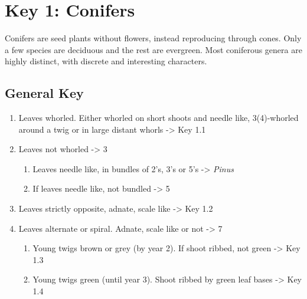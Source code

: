 \documentclass[openany]{book}
\providecommand{\tightlist}{%
  \setlength{\itemsep}{0pt}\setlength{\parskip}{0pt}}
\begin{document}
\hypertarget{key-1-conifers}{%
\chapter*{Key 1: Conifers}\label{key-1-conifers}}

Conifers are seed plants without flowers, instead reproducing through cones. Only a few species are deciduous and the rest are evergreen. Most coniferous genera are highly distinct, with discrete and interesting characters.

\hypertarget{general-key-1}{%
\section*{General Key}\label{general-key-1}}

\begin{enumerate}
\def\labelenumi{\arabic{enumi}.}
\item
  Leaves whorled. Either whorled on short shoots and needle like, 3(4)-whorled around a twig or in large distant whorls -\textgreater{} Key 1.1
\item
  Leaves not whorled -\textgreater{} 3

  \begin{enumerate}
  \def\labelenumii{\arabic{enumii}.}
  \setcounter{enumii}{2}
  \tightlist
  \item
    Leaves needle like, in bundles of 2's, 3's or 5's -\textgreater{} \emph{Pinus}
  \item
    If leaves needle like, not bundled -\textgreater{} 5
  \end{enumerate}
\item
  Leaves strictly opposite, adnate, scale like -\textgreater{} Key 1.2
\item
  Leaves alternate or spiral. Adnate, scale like or not -\textgreater{} 7

  \begin{enumerate}
  \def\labelenumii{\arabic{enumii}.}
  \setcounter{enumii}{6}
  \tightlist
  \item
    Young twigs brown or grey (by year 2). If shoot ribbed, not green -\textgreater{} Key 1.3
  \item
    Young twigs green (until year 3). Shoot ribbed by green leaf bases -\textgreater{} Key 1.4
  \end{enumerate}
\end{enumerate}
\end{document}
